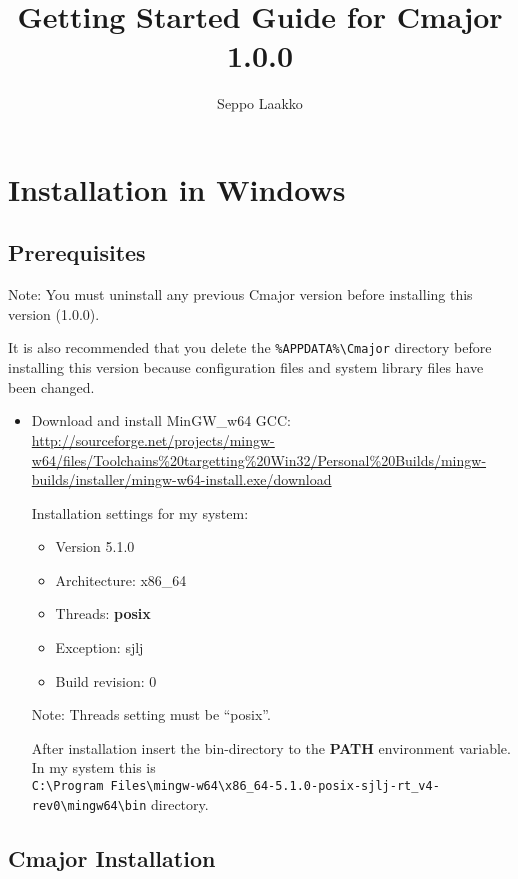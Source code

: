 \documentclass[oneside, a4paper, 11pt]{article}
\begin{document}
\title{Getting Started Guide for Cmajor 1.0.0}
\author{Seppo Laakko}
\maketitle

\section{Installation in Windows}

\subsection{Prerequisites}

Note:
You must uninstall any previous Cmajor version before installing
this version (1.0.0).

It is also recommended that you delete the
\verb|%APPDATA%\Cmajor| directory before installing
this version because configuration files and system library files
have been changed.

\begin{itemize}

\item
Download and install MinGW\_w64 GCC:\\
\url{http://sourceforge.net/projects/mingw-w64/files/Toolchains%20targetting%20Win32/Personal%20Builds/mingw-builds/installer/mingw-w64-install.exe/download}

Installation settings for my system:
\begin{itemize}
\item
Version 5.1.0
\item
Architecture: x86\_64
\item
Threads: \textbf{posix}
\item
Exception: sjlj
\item
Build revision: 0
\end{itemize}

Note: Threads setting must be ``posix''.

After installation insert the bin-directory to the \textbf{PATH} environment variable.
In my system this is\\
\verb|C:\Program Files\mingw-w64\x86_64-5.1.0-posix-sjlj-rt_v4-rev0\mingw64\bin| directory.

\end{itemize}

\subsection{Cmajor Installation}
\end{document}
